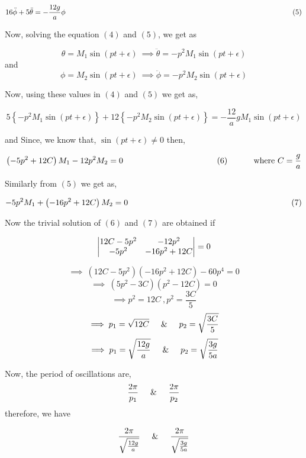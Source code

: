 \documentclass[12pt, a4paper]{article} %
\begin{document}
$\displaystyle 16\ddot{\phi} + 5\ddot{\theta} = -\frac{12g}{a}\phi \hspace*{11cm}(5)$

Now, solving the equation $(4)$ and $(5)$, we get as

\[\theta = M_1\sin(pt + \epsilon)\ \implies \ddot{\theta} = -p^2 M_1\sin(pt + \epsilon)\]
and
\[\phi = M_2\sin(pt + \epsilon)\ \implies \ddot{\phi} = -p^2 M_2\sin(pt + \epsilon)\]

Now, using these values in $(4)$ and $(5)$ we get as,

\[5\left\{-p^2 M_1\sin(pt + \epsilon)\right\} + 12\left\{-p^2 M_2\sin(pt + \epsilon)\right\} = -\frac{12}{a}g M_1\sin(pt + \epsilon)\]

\BgThispage

and Since, we know that, $\displaystyle \sin(pt + \epsilon) \neq 0$ then,

\[\left(-5p^2 + 12C\right)M_1 - 12p^2 M_2 = 0 \hspace*{4cm}(6)\ \hspace{1cm} \mbox{where}\ C = \frac{g}{a}\]

Similarly from $(5)$ we get as,

\[-5p^2 M_1 + \left(-16p^2 + 12C\right)M_2 = 0\hspace*{7cm}(7)\]

Now the trivial solution of $(6)$ and $(7)$ are obtained if

\[\begin{vmatrix}
    12C - 5p^2 & -12p^2 \\
    -5p^2 & -16p^2 + 12C \notag
\end{vmatrix} = 0\]

\[\implies\ \left(12C - 5p^2\right)\left(-16p^2 + 12C\right) - 60p^4 = 0\]
\[\implies\ \left(5p^2-3C\right)\left(p^2 - 12C\right) = 0\]
\[\implies p^2 = 12C\ , p^2 = \frac{3C}{5}\]
\[\implies p_1 = \sqrt{12C}\hspace{5mm} \mbox{\&}\hspace{5mm} p_2 = \sqrt{\frac{3C}{5}}\]
\[\implies p_1 = \sqrt{\frac{12g}{a}}\hspace{5mm} \mbox{\&}\hspace{5mm} p_2 = \sqrt{\frac{3g}{5a}}\]

Now, the period of oscillations are,
\[\frac{2 \pi}{p_1}\hspace*{5mm} \mbox{\&}\hspace*{5mm} \frac{2 \pi}{p_2}\]
therefore, we have

\[\frac{2 \pi}{\sqrt{\frac{12g}{a}}}\hspace*{5mm} \mbox{\&}\hspace*{5mm} \frac{2 \pi}{\sqrt{\frac{3g}{5a}}}\]
\end{document}
